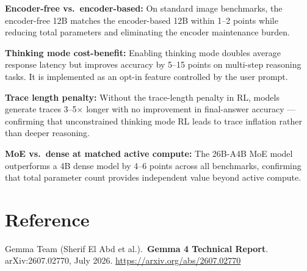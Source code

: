 \documentclass[10pt,twocolumn]{article}
\begin{document}
\textbf{Encoder-free vs.\ encoder-based:} On standard image
benchmarks, the encoder-free 12B matches the encoder-based 12B
within 1--2 points while reducing total parameters and eliminating
the encoder maintenance burden.

\textbf{Thinking mode cost-benefit:} Enabling thinking mode doubles
average response latency but improves accuracy by 5--15 points on
multi-step reasoning tasks.
It is implemented as an opt-in feature controlled by the user prompt.

\textbf{Trace length penalty:} Without the trace-length penalty in RL,
models generate traces 3--5$\times$ longer with no improvement in
final-answer accuracy --- confirming that unconstrained thinking mode
RL leads to trace inflation rather than deeper reasoning.

\textbf{MoE vs.\ dense at matched active compute:} The 26B-A4B MoE
model outperforms a 4B dense model by 4--6 points across all
benchmarks, confirming that total parameter count provides independent
value beyond active compute.

\section*{Reference}

Gemma Team (Sherif El Abd et al.).\
\textbf{Gemma 4 Technical Report}.
arXiv:2607.02770, July 2026.
\url{https://arxiv.org/abs/2607.02770}
\end{document}
